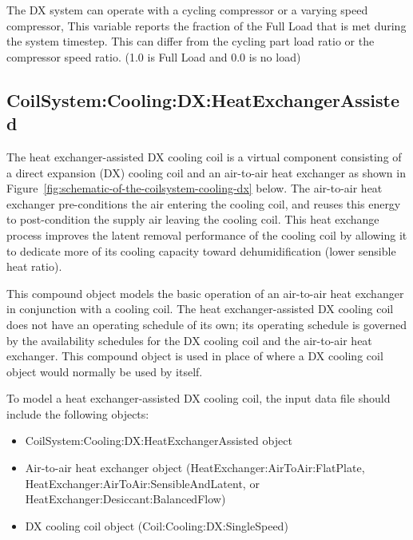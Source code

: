 The DX system can operate with a cycling compressor or a varying speed compressor, This variable reports the fraction of the Full Load that is met during the system timestep. This can differ from the cycling part load ratio or the compressor speed ratio. (1.0 is Full Load and 0.0 is no load)

\subsection{CoilSystem:Cooling:DX:HeatExchangerAssisted}\label{coilsystemcoolingdxheatexchangerassisted}

The heat exchanger-assisted DX cooling coil is a virtual component consisting of a direct expansion (DX) cooling coil and an air-to-air heat exchanger as shown in Figure~\ref{fig:schematic-of-the-coilsystem-cooling-dx} below. The air-to-air heat exchanger pre-conditions the air entering the cooling coil, and reuses this energy to post-condition the supply air leaving the cooling coil. This heat exchange process improves the latent removal performance of the cooling coil by allowing it to dedicate more of its cooling capacity toward dehumidification (lower sensible heat ratio).

This compound object models the basic operation of an air-to-air heat exchanger in conjunction with a cooling coil. The heat exchanger-assisted DX cooling coil does not have an operating schedule of its own; its operating schedule is governed by the availability schedules for the DX cooling coil and the air-to-air heat exchanger. This compound object is used in place of where a DX cooling coil object would normally be used by itself.

To model a heat exchanger-assisted DX cooling coil, the input data file should include the following objects:

\begin{itemize}
\item
  CoilSystem:Cooling:DX:HeatExchangerAssisted object
\item
  Air-to-air heat exchanger object (HeatExchanger:AirToAir:FlatPlate, HeatExchanger:AirToAir:SensibleAndLatent, or HeatExchanger:Desiccant:BalancedFlow)
\item
  DX cooling coil object (Coil:Cooling:DX:SingleSpeed)
\end{itemize}

